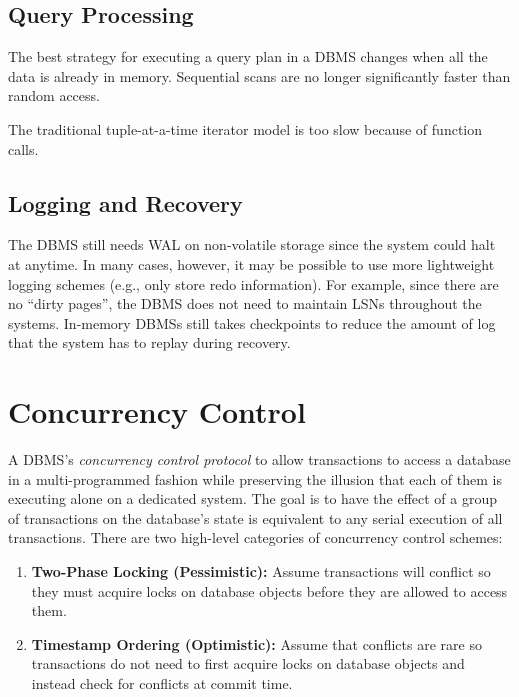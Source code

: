 \documentclass[11pt]{article}
\begin{document}
\subsection*{Query Processing}
The best strategy for executing a query plan in a DBMS changes when all the data is 
already in memory. Sequential scans are no longer significantly faster than random access.
        
The traditional tuple-at-a-time iterator model is too slow because of function calls.
    
\subsection*{Logging and Recovery}
The DBMS still needs WAL on non-volatile storage since the system could halt at anytime.
In many cases, however, it may be possible to use more lightweight logging schemes (e.g., only 
store 
redo information). For example, since there are no ``dirty pages'', the DBMS does not need to 
maintain LSNs throughout the systems.
%         
In-memory DBMSs still takes checkpoints to reduce the amount of log that the system has to replay 
during recovery.

\section{Concurrency Control}
A DBMS's \textit{concurrency control protocol} to allow transactions to access a database in a 
multi-programmed fashion while preserving the illusion that each of them is executing alone on a 
dedicated system. The goal is to have the effect of a group of transactions on the database's state 
is equivalent to any serial execution of all transactions. There are two high-level categories of 
concurrency control schemes:
\begin{enumerate}
    \item \textbf{Two-Phase Locking (Pessimistic):}
    Assume transactions will conflict so they must acquire locks on database objects before they 
    are allowed to access them.
    
    \item \textbf{Timestamp Ordering (Optimistic):}
    Assume that conflicts are rare so transactions do not need to first acquire locks on database 
    objects and instead check for conflicts at commit time.
\end{enumerate}
\end{document}
